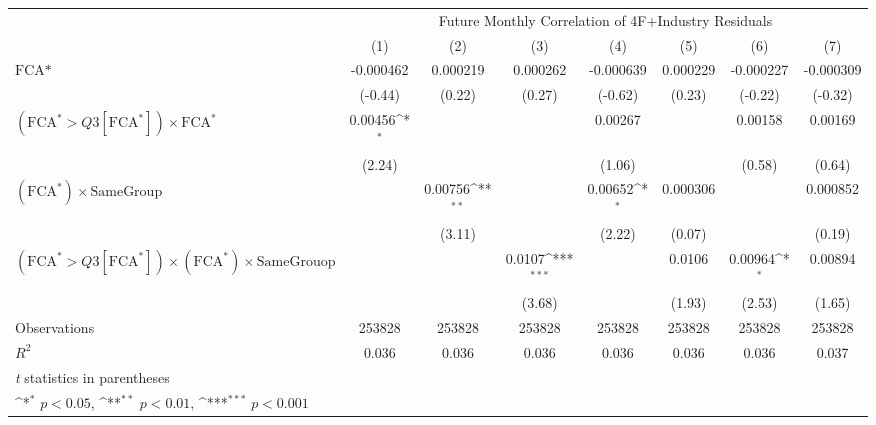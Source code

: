 {
\def\sym#1{\ifmmode^{#1}\else\(^{#1}\)\fi}
\begin{tabular}{l*{7}{c}}
\hline\hline
                &\multicolumn{7}{c}{Future Monthly Correlation of 4F+Industry Residuals}                                                             \\\cmidrule(lr){2-8}
                &\multicolumn{1}{c}{(1)}         &\multicolumn{1}{c}{(2)}         &\multicolumn{1}{c}{(3)}         &\multicolumn{1}{c}{(4)}         &\multicolumn{1}{c}{(5)}         &\multicolumn{1}{c}{(6)}         &\multicolumn{1}{c}{(7)}         \\
\hline
$ \text{FCA*} $ &-0.000462         & 0.000219         & 0.000262         &-0.000639         & 0.000229         &-0.000227         &-0.000309         \\
                &  (-0.44)         &   (0.22)         &   (0.27)         &  (-0.62)         &   (0.23)         &  (-0.22)         &  (-0.32)         \\
[1em]
 $ (\text{FCA}^* > Q3[\text{FCA}^*]) \times {\text{FCA} ^*}  $ &  0.00456\sym{*}  &                  &                  &  0.00267         &                  &  0.00158         &  0.00169         \\
                &   (2.24)         &                  &                  &   (1.06)         &                  &   (0.58)         &   (0.64)         \\
[1em]
 $ (\text{FCA}^*) \times {\text{SameGroup} }  $ &                  &  0.00756\sym{**} &                  &  0.00652\sym{*}  & 0.000306         &                  & 0.000852         \\
                &                  &   (3.11)         &                  &   (2.22)         &   (0.07)         &                  &   (0.19)         \\
[1em]
 $ (\text{FCA}^* > Q3[\text{FCA}^*]) \times  (\text{FCA}^*) \times {\text{SameGrouop}}$&                  &                  &   0.0107\sym{***}&                  &   0.0106         &  0.00964\sym{*}  &  0.00894         \\
                &                  &                  &   (3.68)         &                  &   (1.93)         &   (2.53)         &   (1.65)         \\
\hline
Observations    &   253828         &   253828         &   253828         &   253828         &   253828         &   253828         &   253828         \\
\(R^{2}\)       &    0.036         &    0.036         &    0.036         &    0.036         &    0.036         &    0.036         &    0.037         \\
\hline\hline
\multicolumn{8}{l}{\footnotesize \textit{t} statistics in parentheses}\\
\multicolumn{8}{l}{\footnotesize \sym{*} \(p<0.05\), \sym{**} \(p<0.01\), \sym{***} \(p<0.001\)}\\
\end{tabular}
}
